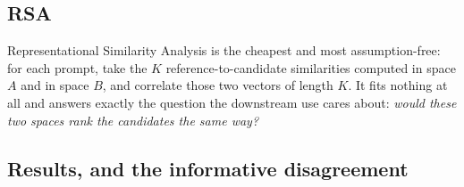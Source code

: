 \documentclass[10pt]{article}
\begin{document}
\subsection{RSA}

Representational Similarity Analysis is the cheapest and most assumption-free: for each prompt, take
the $K$ reference-to-candidate similarities computed in space $A$ and in space $B$, and correlate
those two vectors of length $K$. It fits nothing at all and answers exactly the question the
downstream use cares about: \emph{would these two spaces rank the candidates the same way?}

\subsection{Results, and the informative disagreement}
\end{document}
